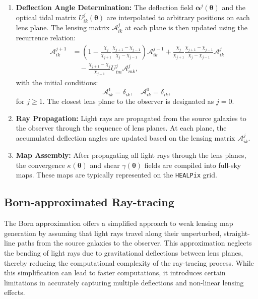 \begin{enumerate}
    \item \textbf{Deflection Angle Determination:} 
        The deflection field $\boldsymbol{\alpha}^j(\boldsymbol{\theta})$ and the optical tidal matrix $U_{ik}^j(\boldsymbol{\theta})$ are interpolated to arbitrary positions on each lens plane. The lensing matrix $\mathcal{A}^j_{ik}$ at each plane is then updated using the recurrence relation:
        \begin{equation}
            \begin{aligned}
                \mathcal{A}_{i k}^{j+1} & = \left(1 - \frac{\chi_j}{\chi_{j+1}} \frac{\chi_{j+1} - \chi_{j-1}}{\chi_j - \chi_{j-1}} \right) \mathcal{A}_{i k}^{j-1} + \frac{\chi_j}{\chi_{j+1}} \frac{\chi_{j+1} - \chi_{j-1}}{\chi_j - \chi_{j-1}} \mathcal{A}_{i k}^j \\
                & \quad - \frac{\chi_{j+1} - \chi_j}{\chi_{j-1}} U_{i m}^j \mathcal{A}_{m k}^j,
            \end{aligned}
        \end{equation}
        with the initial conditions:
        \begin{equation}
            \mathcal{A}_{i k}^1 = \delta_{i k}, \quad \mathcal{A}_{i k}^0 = \delta_{i k},
        \end{equation}
    for $j \geq 1$. The closest lens plane to the observer is designated as $j = 0$.

    \item \textbf{Ray Propagation:} 
    Light rays are propagated from the source galaxies to the observer through the sequence of lens planes. At each plane, the accumulated deflection angles are updated based on the lensing matrix $\mathcal{A}^j_{ik}$. 

    \item \textbf{Map Assembly:} 
    After propagating all light rays through the lens planes, the convergence $\kappa(\boldsymbol{\theta})$ and shear $\gamma(\boldsymbol{\theta})$ fields are compiled into full-sky maps. These maps are typically represented on the \texttt{HEALPix} grid.
\end{enumerate}

\subsection{Born-approximated Ray-tracing}
The Born approximation offers a simplified approach to weak lensing map generation by assuming that light rays travel along their unperturbed, straight-line paths from the source galaxies to the observer. This approximation neglects the bending of light rays due to gravitational deflections between lens planes, thereby reducing the computational complexity of the ray-tracing process. While this simplification can lead to faster computations, it introduces certain limitations in accurately capturing multiple deflections and non-linear lensing effects.

